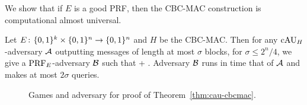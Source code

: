 We show that if $E$ is a good PRF, then the CBC-MAC construction is computational almost universal.
\begin{theorem}
Let $E{{\kern .05em}\colon{\kern .05em}}\{0,1\}^k\times\{0,1\}^n\rightarrow\{0,1\}^n$ and $H$ be the CBC-MAC. 
Then for any $\textnormal{cAU}_H$-adversary ${\mathcal A}$ outputting messages of length at most
$\sigma$ blocks, for $\sigma\leq 2^n/4$, we give a $\textnormal{PRF}_E$-adversary ${\mathcal B}$
such that
\bnm
   \le {} +  \;.
\enm
Adversary ${\mathcal B}$ runs in time that of ${\mathcal A}$ and makes at most $2\sigma$
queries.
\label{thm:cau-cbcmac}
\end{theorem}
\begin{figure}
\centering
{}
\caption{Games and adversary for proof of Theorem~\ref{thm:cau-cbcmac}.}
\label{fig:games-cau-cbcmac}
\end{figure}

